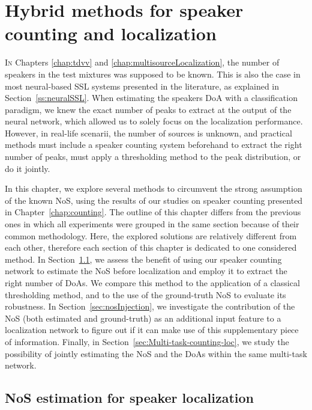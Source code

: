 \chapter{Hybrid methods for speaker counting and localization}
\label{chap:countingLocalization}

\lettrine{I}{n} Chapters \ref{chap:tdvv} and \ref{chap:multisourceLocalization}, the number of speakers in the test mixtures was supposed to be known. This is also the case in most neural-based SSL systems presented in the literature, as explained in Section~\ref{ss:neuralSSL}. When estimating the speakers DoA with a classification paradigm, we knew the exact number of peaks to extract at the output of the neural network, which allowed us to solely focus on the localization performance. However, in real-life scenarii, the number of sources is unknown, and practical methods must include a speaker counting system beforehand to extract the right number of peaks, must apply a thresholding method to the peak distribution, or do it jointly.

In this chapter, we explore several methods to circumvent the strong assumption of the known NoS, using the results of our studies on speaker counting presented in Chapter~\ref{chap:counting}. The outline of this chapter differs from the previous ones in which all experiments were grouped in the same section because of their common methodology. Here, the explored solutions are relatively different from each other, therefore each section of this chapter is dedicated to one considered method. In Section~\ref{sec:nosEstimation}, we assess the benefit of using our speaker counting network to estimate the NoS before localization and employ it to extract the right number of DoAs. We compare this method to the application of a classical thresholding method, and to the use of the ground-truth NoS to evaluate its robustness. In Section~\ref{sec:nosInjection}, we investigate the contribution of the NoS (both estimated and ground-truth) as an additional input feature to a localization network to figure out if it can make use of this supplementary piece of information. Finally, in Section~\ref{sec:Multi-task-counting-loc}, we study the possibility of jointly estimating the NoS and the DoAs within the same multi-task network.

\section{NoS estimation for speaker localization}
\label{sec:nosEstimation}

